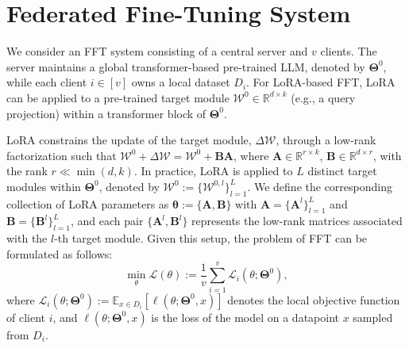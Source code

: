 \documentclass{article} %
\begin{document}
\section{Federated Fine-Tuning System}\label{sec:system_formula}

We consider an FFT system consisting of a central server and $v$ clients. The server maintains a global transformer-based pre-trained LLM, denoted by $\boldsymbol{\Theta}^0$, while each client $i\in[v]$ owns a local dataset $D_i$. 
% 
For LoRA-based FFT, LoRA can be applied to a pre-trained target module $\boldsymbol{\mathcal{W}}^0\in\mathbb{R}^{d \times k}$ (e.g., a query projection) within a transformer block of $\boldsymbol{\Theta}^0$. %


% 
LoRA constrains the update of the target module, $\Delta \boldsymbol{\mathcal{W}}$, through a low-rank factorization such that $\boldsymbol{\mathcal{W}}^0 + \Delta\boldsymbol{\mathcal{W}}=\boldsymbol{\mathcal{W}}^0+\mathbf{B}\mathbf{A}$, where ${\mathbf{A}}\in\mathbb{R}^{r \times k}$, ${\mathbf{B}}\in\mathbb{R}^{d \times r}$, with the rank $r \ll \min(d, k)$. In practice, LoRA is applied to $L$ distinct target modules within $\boldsymbol{\Theta}^0$, denoted by  $\boldsymbol{\mathcal{W}}^{0}:=\{ \boldsymbol{\mathcal{W}}^{0,l}\}_{l=1}^{L}$. We define the corresponding collection of LoRA parameters as $\boldsymbol{\theta} := \{{\mathbf{A}},{\mathbf{B}}\}$ with $\mathbf{A}=\{\mathbf{A}^{l}\}_{l=1}^{L}$ and $\mathbf{B}=\{\mathbf{B}^{l}\}_{l=1}^{L}$, and each pair $\{\mathbf{A}^{l}, \mathbf{B}^{l}\}$ represents the low-rank matrices associated with the $l$-th target module. 
Given this setup, the problem of FFT can be formulated as follows:
\begin{equation}\label{eq:ffm_obj}
\min_{\boldsymbol{\mathcal{\theta}}} \mathcal{L}(\boldsymbol{\mathcal{\theta}}) := \frac{1}{v}\sum_{i=1}^{v} \mathcal{L}_{i}(\boldsymbol{\mathcal{\theta}}; \boldsymbol{\Theta}^0),
\end{equation}
where $\mathcal{L}_{i}(\boldsymbol{\mathcal{\theta}}; \boldsymbol{\Theta}^0) := \mathbb{E}_{x \in  D_i}[\ell(\boldsymbol{\mathcal{\theta}};\boldsymbol{\Theta}^0,x)]$ denotes the local objective function of client $i$, and $\ell(\boldsymbol{\mathcal{\theta}};\boldsymbol{\Theta}^0,x)$ is the loss of the model on a datapoint $x$ sampled from ${D}_i$.
\end{document}
